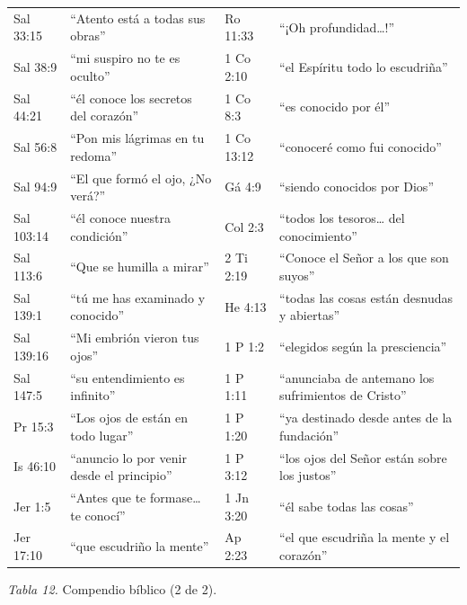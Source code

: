 \begin{center}\small\renewcommand{\arraystretch}{1.12}
\begin{tabular}{@{}L{2.2cm}L{5.0cm}|L{2.2cm}L{5.0cm}@{}}
\toprule
Sal 33:15 & ``Atento está a todas sus obras'' & Ro 11:33 & ``¡Oh profundidad\ldots!'' \\
Sal 38:9 & ``mi suspiro no te es oculto'' & 1 Co 2:10 & ``el Espíritu todo lo escudriña'' \\
Sal 44:21 & ``él conoce los secretos del corazón'' & 1 Co 8:3 & ``es conocido por él'' \\
Sal 56:8 & ``Pon mis lágrimas en tu redoma'' & 1 Co 13:12 & ``conoceré como fui conocido'' \\
Sal 94:9 & ``El que formó el ojo, ¿No verá?'' & Gá 4:9 & ``siendo conocidos por Dios'' \\
Sal 103:14 & ``él conoce nuestra condición'' & Col 2:3 & ``todos los tesoros\ldots{} del conocimiento'' \\
Sal 113:6 & ``Que se humilla a mirar'' & 2 Ti 2:19 & ``Conoce el Señor a los que son suyos'' \\
Sal 139:1 & ``tú me has examinado y conocido'' & He 4:13 & ``todas las cosas están desnudas y abiertas'' \\
Sal 139:16 & ``Mi embrión vieron tus ojos'' & 1 P 1:2 & ``elegidos según la presciencia'' \\
Sal 147:5 & ``su entendimiento es infinito'' & 1 P 1:11 & ``anunciaba de antemano los sufrimientos de Cristo'' \\
Pr 15:3 & ``Los ojos de \SENOR{} están en todo lugar'' & 1 P 1:20 & ``ya destinado desde antes de la fundación'' \\
Is 46:10 & ``anuncio lo por venir desde el principio'' & 1 P 3:12 & ``los ojos del Señor están sobre los justos'' \\
Jer 1:5 & ``Antes que te formase\ldots{} te conocí'' & 1 Jn 3:20 & ``él sabe todas las cosas'' \\
Jer 17:10 & ``que escudriño la mente'' & Ap 2:23 & ``el que escudriña la mente y el corazón'' \\
\bottomrule
\end{tabular}\par
{\footnotesize\color{gris}\textit{Tabla 12.} Compendio bíblico (2 de 2).}
\end{center}

